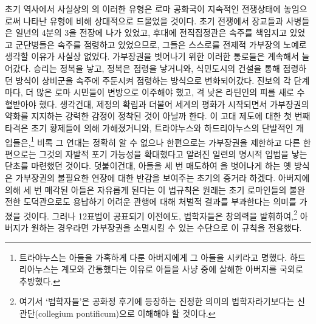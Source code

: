 초기 역사에서
사실상의 의 이러한 유형은
로마 공화국이 지속적인 전쟁상태에 놓임으로써 나타난 유형에 비해
상대적으로 드물었을 것이다.
초기 전쟁에서 장교들과 사병들은 일년의 4분의 3을 전장에 나가 있었고,
후대에 전직집정관은 속주를 책임지고 있었고
군단병들은 속주를 점령하고 있었으므로,
그들은 스스로를 전제적 가부장의 노예로 생각할 이유가 사실상 없었다.
가부장권을 벗어나기 위한 이러한 통로들은 계속해서 늘어갔다.
승리는 정복을 낳고, 정복은 점령을 낳거니와,
식민도시의 건설을 통해 점령하던 방식이
상비군을 속주에 주둔시켜 점령하는 방식으로
변화되어갔다.
진보의 각 단계마다,
더 많은 로마 시민들이 변방으로 이주해야 했고,
격 낮은 라틴인의 피를 새로 수혈받아야 했다.
생각건대,
제정의 확립과 더불어 세계의 평화가 시작되면서
가부장권의 약화를 지지하는 강력한 감정이 정착된 것이 아닐까 한다.
이 고대 제도에 대한 첫 번째 타격은 초기 황제들에 의해 가해졌거니와,
트라야누스와 하드리아누스의 단발적인 개입들은,\footnote{트라야누스는
아들을 가혹하게 다룬 아버지에게 그 아들을 시키라고 명했다.
하드리아누스는 계모와 간통했다는 이유로 아들을 사냥 중에 살해한 아버지를
국외로 추방했다.}
비록 그 연대는 정확히 알 수 없으나
한편으로는 가부장권을 제한하고
다른 한편으로는 그것의 자발적 포기 가능성을 확대했다고 알려진
일련의 명시적 입법을 낳는 단초를 마련했던 것이다.
덧붙이건대, 아들을 세 번 매도하여 을 벗어나게 하는 옛 방식은
가부장권의 불필요한 연장에 대한 반감을 보여주는
초기의 증거라 하겠다.
아버지에 의해 세 번 매각된 아들은 자유롭게 된다는 이 법규칙은
원래는
초기 로마인들의 불완전한 도덕관으로도
용납하기 어려운 관행에 대해 처벌적 결과를 부과한다는 의미를 가졌을 것이다.
그러나 12표법이 공표되기 이전에도,
법학자들은 창의력을 발휘하여,\footnote{여기서 `법학자들'은
공화정 후기에 등장하는 진정한 의미의 법학자라기보다는
신관단(collegium pontificum)으로 이해해야 할 것이다.}
아버지가 원하는 경우라면 가부장권을 소멸시킬 수 있는 수단으로
이 규칙을 전용했다.

